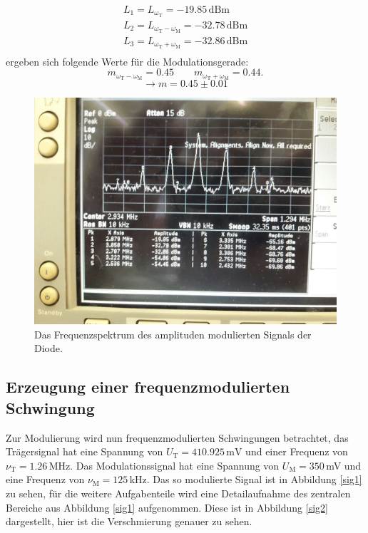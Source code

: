 \begin{align}
    L_1=L_{\omega_{\text{T}}}=-19.85 \, \text{dBm}\\
    L_2=L_{\omega_{\text{T}}-\omega_{\text{M}}}=-32.78 \, \text{dBm}\\
    L_3=L_{\omega_{\text{T}}+\omega_{\text{M}}}=-32.86 \, \text{dBm}\\
\end{align}
ergeben sich folgende Werte für die Modulationsgerade:
$$ m_{\omega_{\text{T}}-\omega_{\text{M}}}=0.45 \quad \quad m_{\omega_{\text{T}}+\omega_{\text{M}}}=0.44.$$
$$ \rightarrow m=0.45 \pm 0.01$$
\begin{figure}
  \centering
  \includegraphics[width=0.7\linewidth]{ressources/photo5384285734183217711.jpg}
  \caption{Das Frequenzspektrum des amplituden modulierten Signals der Diode.}
  \label{spek2}
\end{figure}


\subsection{Erzeugung einer frequenzmodulierten Schwingung}
Zur Modulierung wird nun frequenzmodulierten Schwingungen betrachtet, das Trägersignal
hat eine Spannung von $U_\text{T}=  410.925\,\text{mV}$ und einer Frequenz von
$\nu_\text{T}=1.26 \, \text{MHz}$. Das Modulationssignal hat eine Spannung von
$U_\text{M}=350\,$mV und eine Frequenz von $\nu_\text{M}=125\,$kHz.
Das so modulierte Signal ist in Abbildung \ref{sig1} zu sehen, für die
weitere Aufgabenteile wird eine Detailaufnahme des zentralen Bereiche aus
Abbildung \ref{sig1} aufgenommen. Diese ist in Abbildung \ref{sig2} dargestellt,
hier ist die Verschmierung genauer zu sehen.\\

